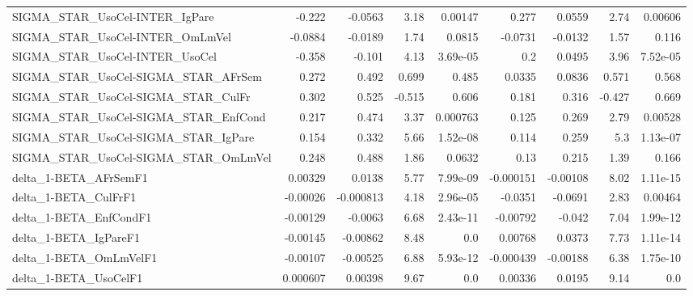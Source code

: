 \begin{tabular}{lrrrrrrrr}
SIGMA\_STAR\_UsoCel-INTER\_IgPare        &      -0.222 &      -0.0563 &    3.18 &  0.00147 &      0.277 &      0.0559 &         2.74 &       0.00606 \\
SIGMA\_STAR\_UsoCel-INTER\_OmLmVel       &     -0.0884 &      -0.0189 &    1.74 &   0.0815 &    -0.0731 &     -0.0132 &         1.57 &         0.116 \\
SIGMA\_STAR\_UsoCel-INTER\_UsoCel        &      -0.358 &       -0.101 &    4.13 & 3.69e-05 &        0.2 &      0.0495 &         3.96 &      7.52e-05 \\
SIGMA\_STAR\_UsoCel-SIGMA\_STAR\_AFrSem   &       0.272 &        0.492 &   0.699 &    0.485 &     0.0335 &      0.0836 &        0.571 &         0.568 \\
SIGMA\_STAR\_UsoCel-SIGMA\_STAR\_CulFr    &       0.302 &        0.525 &  -0.515 &    0.606 &      0.181 &       0.316 &       -0.427 &         0.669 \\
SIGMA\_STAR\_UsoCel-SIGMA\_STAR\_EnfCond  &       0.217 &        0.474 &    3.37 & 0.000763 &      0.125 &       0.269 &         2.79 &       0.00528 \\
SIGMA\_STAR\_UsoCel-SIGMA\_STAR\_IgPare   &       0.154 &        0.332 &    5.66 & 1.52e-08 &      0.114 &       0.259 &          5.3 &      1.13e-07 \\
SIGMA\_STAR\_UsoCel-SIGMA\_STAR\_OmLmVel  &       0.248 &        0.488 &    1.86 &   0.0632 &       0.13 &       0.215 &         1.39 &         0.166 \\
delta\_1-BETA\_AFrSemF1                 &     0.00329 &       0.0138 &    5.77 & 7.99e-09 &  -0.000151 &    -0.00108 &         8.02 &      1.11e-15 \\
delta\_1-BETA\_CulFrF1                  &    -0.00026 &    -0.000813 &    4.18 & 2.96e-05 &    -0.0351 &     -0.0691 &         2.83 &       0.00464 \\
delta\_1-BETA\_EnfCondF1                &    -0.00129 &      -0.0063 &    6.68 & 2.43e-11 &   -0.00792 &      -0.042 &         7.04 &      1.99e-12 \\
delta\_1-BETA\_IgPareF1                 &    -0.00145 &     -0.00862 &    8.48 &      0.0 &    0.00768 &      0.0373 &         7.73 &      1.11e-14 \\
delta\_1-BETA\_OmLmVelF1                &    -0.00107 &     -0.00525 &    6.88 & 5.93e-12 &  -0.000439 &    -0.00188 &         6.38 &      1.75e-10 \\
delta\_1-BETA\_UsoCelF1                 &    0.000607 &      0.00398 &    9.67 &      0.0 &    0.00336 &      0.0195 &         9.14 &           0.0 \\

\end{tabular}
